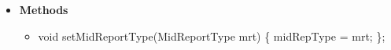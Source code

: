 \begin{refsection}
\begin{itemize}
  \item \textbf{Methods}
  \begin{itemize}
    \item void setMidReportType(MidReportType mrt) \{ midRepType = mrt; \};
  \end{itemize}
\end{itemize}




\clearpage
\printbibliography[heading=subbibliography]
\end{refsection}
\cleardoublepage
